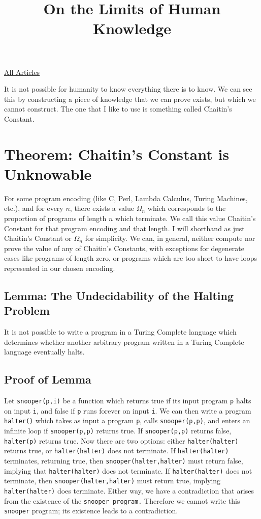 \documentclass{article}
\title{On the Limits of Human Knowledge}
\begin{document}
\maketitle
\begin{center}
  \href{../index.html}{All Articles}
\end{center}
It is not possible for humanity to know everything there is to know. We can see this by constructing a piece of knowledge that we can prove exists, but which we cannot construct. The one that I like to use is something called Chaitin's Constant.\\

\section{Theorem: Chaitin's Constant is Unknowable}
For some program encoding (like C, Perl, Lambda Calculus, Turing Machines, etc.), and for every $n$, there exists a value $\Omega_n$ which corresponds to the proportion of programs of length $n$ which terminate. We call this value Chaitin's Constant for that program encoding and that length. I will shorthand as just Chaitin's Constant or $\Omega_n$ for simplicity. We can, in general, neither compute nor prove the value of any of Chaitin's Constants, with exceptions for degenerate cases like programs of length zero, or programs which are too short to have loops represented in our chosen encoding.\\

\subsection{Lemma: The Undecidability of the Halting Problem}
It is not possible to write a program in a Turing Complete language which determines whether another arbitrary program written in a Turing Complete language eventually halts.\\

\subsection{Proof of Lemma}
Let \texttt{snooper(p,i)} be a function which returns true if its input program \texttt{p} halts on input \texttt{i}, and false if \texttt{p} runs forever on input \texttt{i}. We can then write a program \texttt{halter()} which takes as input a program \texttt{p}, calls \texttt{snooper(p,p)}, and enters an infinite loop if \texttt{snooper(p,p)} returns true. If \texttt{snooper(p,p)} returns false, \texttt{halter(p)} returns true. Now there are two options: either \texttt{halter(halter)} returns true, or \texttt{halter(halter)} does not terminate. If \texttt{halter(halter)} terminates, returning true, then \texttt{snooper(halter,halter)} must return false, implying that \texttt{halter(halter)} does not terminate. If \texttt{halter(halter)} does not terminate, then \texttt{snooper(halter,halter)} must return true, implying \texttt{halter(halter)} does terminate. Either way, we have a contradiction that arises from the existence of the \texttt{snooper program.} Therefore we cannot write this \texttt{snooper} program; its existence leads to a contradiction.\\
\end{document}
